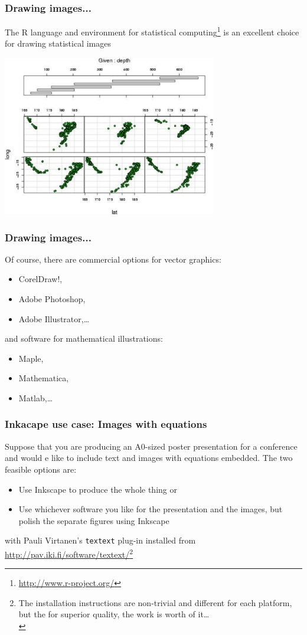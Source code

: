 \documentclass[13pt]{beamer}
\begin{document}
\begin{frame}[fragile]\frametitle{Drawing images...}
The R language and environment for statistical 
computing\footnote{\url{http://www.r-project.org/}}
is an excellent choice for drawing statistical images
\begin{center}
\includegraphics[width=0.7\textwidth]{img/quakes-coplot}
\end{center}
\end{frame}


\begin{frame}[fragile]\frametitle{Drawing images...}
Of course, there are commercial options for vector graphics:
\begin{itemize}
\item CorelDraw!,
\item Adobe Photoshop,
\item Adobe Illustrator,\dots
\end{itemize}
and software for mathematical illustrations:
\begin{itemize}
\item Maple,
\item Mathematica,
\item Matlab,\dots
\end{itemize}
\end{frame}


\begin{frame}[fragile]\frametitle{Inkacape use case: Images with equations}
Suppose that you are producing an A0-sized poster presentation for 
a conference and would e like to include text and images with equations 
embedded. The two feasible options are:\medskip

\begin{itemize}
  \item Use Inkscape to produce the whole thing or
  \item Use whichever software you like for the presentation and the images, but
  polish the separate figures using Inkscape 
\end{itemize} \medskip

with Pauli Virtanen's \texttt{textext} plug-in installed from
\url{http://pav.iki.fi/software/textext/}\footnote{The installation
instructions are non-trivial and different for each platform, but the for
superior quality, the work is worth of it\ldots\\\strut}
\end{frame}
\end{document}

